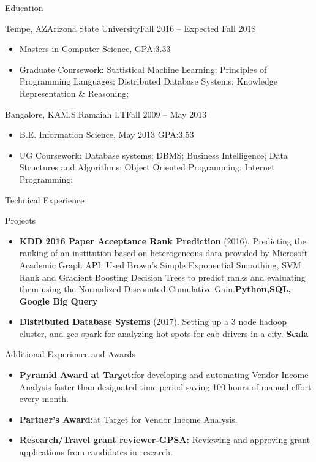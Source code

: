\documentclass[]{nakulcv}
\begin{document}
		\begin{cvsection}{Education}
		\begin{cvsubsection}{Tempe, AZ}{Arizona State University}{Fall 2016 -- Expected Fall 2018}
			\begin{itemize}
				\item Masters in Computer Science, GPA:3.33
				\item Graduate Coursework: Statistical Machine Learning; Principles of Programming Languages; Distributed Database Systems; Knowledge Representation \& Reasoning; 
			\end{itemize}
		\end{cvsubsection}
		\begin{cvsubsection}{Bangalore, KA}{M.S.Ramaiah I.T}{Fall 2009 -- May 2013}
			\begin{itemize}
				\item B.E. Information Science, May 2013 GPA:3.53
				\item UG Coursework: Database systems; DBMS; Business Intelligence; Data Structures and Algorithms; Object Oriented Programming; Internet Programming;
			\end{itemize}
		\end{cvsubsection}
	\end{cvsection}
	\begin{cvsection}{Technical Experience}
		\begin{cvsubsection}{Projects}{}{}
			\begin{itemize}
				\item \textbf{KDD 2016 Paper Acceptance Rank Prediction} (2016). Predicting the ranking of an institution based on heterogeneous data provided by Microsoft Academic Graph API. Used Brown's Simple Exponential Smoothing, SVM Rank and Gradient Boosting Decision Trees to predict ranks and evaluating them using the Normalized Discounted Cumulative Gain.\textbf{Python,SQL, Google Big Query} 
				\item \textbf{Distributed Database Systems} (2017). Setting up a 3 node hadoop cluster, and geo-spark for analyzing hot spots for cab drivers in a city. \textbf{Scala}
			\end{itemize}
		\end{cvsubsection}
	\end{cvsection}
	\begin{cvsection}{Additional Experience and Awards}
		\begin{cvsubsection}{}{}{}	
			\begin{itemize}
				\item \textbf{Pyramid Award at Target:}for developing and automating Vendor Income Analysis faster than designated time period saving 100 hours of manual effort every month.
				\item \textbf{Partner's Award:}at Target for Vendor Income Analysis. 
				\item \textbf{Research/Travel grant reviewer-GPSA:} Reviewing and approving grant applications from candidates in research. 
			\end{itemize}
		\end{cvsubsection}
	\end{cvsection}
\end{document}
